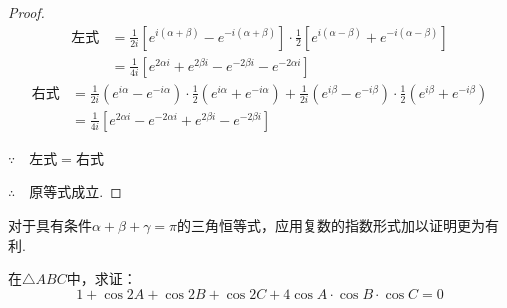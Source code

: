 \begin{proof}
\[\begin{split}
\text{左式}&=\frac{1}{2i}\left[e^{i(\alpha+\beta)}-e^{-i(\alpha+\beta)}\right]\cdot \frac{1}{2}\left[e^{i(\alpha-\beta)}+e^{-i(\alpha-\beta)}\right]\\
&=\frac{1}{4i}\left[e^{2\alpha i}+e^{2\beta i}-e^{-2\beta i}-e^{-2\alpha i}\right]
\end{split}\]
\[\begin{split}
    \text{右式}&=\frac{1}{2i}\left(e^{i\alpha}-e^{-i\alpha}\right)\cdot\frac{1}{2}\left(e^{i\alpha}+e^{-i\alpha}\right)+\frac{1}{2i}\left(e^{i\beta}-e^{-i\beta}\right)\cdot \frac{1}{2}\left(e^{i\beta}+e^{-i\beta}\right)\\
    &=\frac{1}{4i}\left[e^{2\alpha i}-e^{-2\alpha i}+e^{2\beta i}-e^{-2\beta i}\right]
\end{split}\]

$\because\quad $左式$=$右式

$\therefore\quad $原等式成立.
\end{proof}

对于具有条件$\alpha+\beta+\gamma=\pi$的三角恒等式，应用复数的指数形式加以证明更为有利.

\begin{example}
在$\triangle ABC$中，求证：
\[1+\cos 2A+\cos 2B+\cos 2C+4\cos A\cdot \cos B\cdot \cos C=0\]
\end{example}

